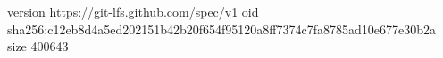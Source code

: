 version https://git-lfs.github.com/spec/v1
oid sha256:c12eb8d4a5ed202151b42b20f654f95120a8ff7374c7fa8785ad10e677e30b2a
size 400643
